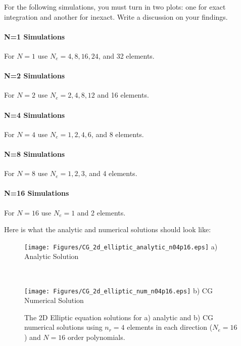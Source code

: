 \documentclass[10pt]{article}
\begin{document}
For the following simulations, you must turn in two plots: one for exact integration and another for inexact. Write a discussion 
on your findings.

\paragraph{N=1 Simulations}
For $N=1$ use $N_e=4, 8, 16, 24$, and 32 elements.

\paragraph{N=2 Simulations}
For $N=2$ use $N_e=2, 4, 8, 12$ and 16 elements.

\paragraph{N=4 Simulations}
For $N=4$ use $N_e=1, 2, 4, 6$, and 8 elements.

\paragraph{N=8 Simulations}
For $N=8$ use $N_e=1, 2, 3$, and 4 elements.

\paragraph{N=16 Simulations}
For $N=16$ use $N_e=1$ and 2 elements.

Here is what the analytic and numerical solutions should look like:
\begin{figure}[h]
\begin{center}
\begin{minipage}{2.20in}
\texttt{[image: Figures/CG\_2d\_elliptic\_analytic\_n04p16.eps]}
a) Analytic Solution
\end{minipage} \ \hspace{0.125in} \
\begin{minipage}{2.20in}
\texttt{[image: Figures/CG\_2d\_elliptic\_num\_n04p16.eps]}
b) CG Numerical Solution
\end{minipage} 
\caption{The 2D Elliptic equation solutions for a) analytic and b) CG numerical solutions using $n_r=4$ elements in each direction ($N_e=16$) and $N=16$ order 
polynomials.}
\end{center}
\end{figure}
\end{document}
